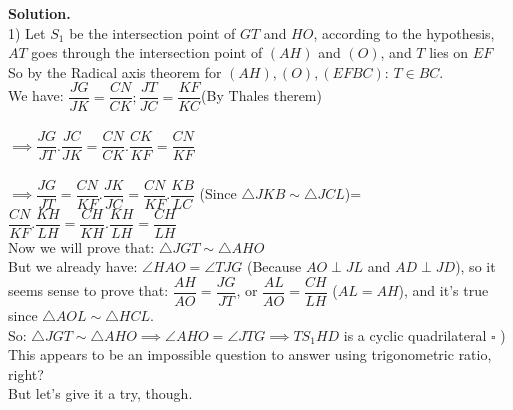 \documentclass[a4paper,12pt,twoside]{book}
\begin{document}
{\textbf{Solution.}\\
1) Let $S_1$ be the intersection point of $GT$ and $HO$, according to the hypothesis, $AT$ goes through the intersection point of $(AH)$ and $(O)$, and $T$ lies on $EF$\\So by the Radical axis theorem for $(AH), (O), (EFBC)$: $T \in BC$.\\
We have: $\dfrac{JG}{JK}=\dfrac{CN}{CK};\dfrac{JT}{JC}=\dfrac{KF}{KC}$(By Thales therem)\\\\
$\implies \dfrac{JG}{JT}.\dfrac{JC}{JK}=\dfrac{CN}{CK}.\dfrac{CK}{KF}=\dfrac{CN}{KF}$\\\\
$\implies \dfrac{JG}{JT}=\dfrac{CN}{KF}.\dfrac{JK}{JC}=\dfrac{CN}{KF}.\dfrac{KB}{LC}$ (Since $\triangle{JKB}\sim \triangle{JCL}$)=$\dfrac{CN}{KF}.\dfrac{KH}{LH}=\dfrac{CH}{KH}.\dfrac{KH}{LH}=\dfrac{CH}{LH}$\\
Now we will prove that: $\triangle{JGT} \sim \triangle{AHO}$\\ But we already have: $\angle{HAO}=\angle{TJG}$ (Because $AO\perp JL$ and $AD\perp JD$), so it seems sense to prove that: $\dfrac{AH}{AO}=\dfrac{JG}{JT}$, or $\dfrac{AL}{AO}=\dfrac{CH}{LH}$ ($AL=AH$), and it's true since $\triangle{AOL}\sim \triangle{HCL}$.\\
So: $\triangle{JGT} \sim \triangle{AHO} \implies \angle{AHO}=\angle{JTG}\implies TS_1HD$ is a cyclic quadrilateral $\square$
) This appears to be an impossible question to answer using trigonometric ratio, right?\\But let's give it a try, though.
\begin{center}


\end{center}}
\end{document}
